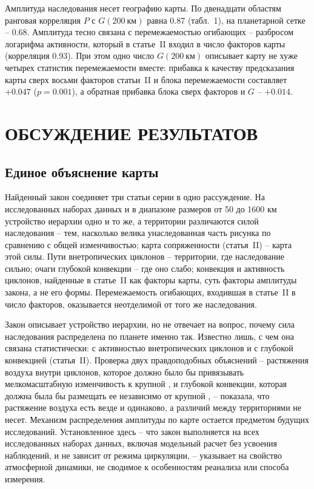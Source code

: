 \documentclass[12pt,a4paper]{article}
\begin{document}
Амплитуда наследования несет географию карты. По двенадцати областям ранговая корреляция $P$ с $G(200~\text{км})$ равна 0.87 (табл.~1), на планетарной сетке -- 0.68. Амплитуда тесно связана с перемежаемостью огибающих -- разбросом логарифма активности, который в статье~II входил в число факторов карты (корреляция 0.93). При этом одно число $G(200~\text{км})$ описывает карту не хуже четырех статистик перемежаемости вместе: прибавка к качеству предсказания карты сверх восьми факторов статьи~II и блока перемежаемости составляет $+0.047$ ($p = 0.001$), а обратная прибавка блока сверх факторов и $G$ -- $+0.014$.

\section{ОБСУЖДЕНИЕ РЕЗУЛЬТАТОВ}

\subsection{Единое объяснение карты}

Найденный закон соединяет три статьи серии в одно рассуждение. На исследованных наборах данных и в диапазоне размеров от 50 до 1600 км устройство иерархии одно и то же, а территории различаются силой наследования -- тем, насколько велика унаследованная часть рисунка по сравнению с общей изменчивостью; карта сопряженности (статья~II) -- карта этой силы. Пути внетропических циклонов -- территории, где наследование сильно; очаги глубокой конвекции -- где оно слабо; конвекция и активность циклонов, найденные в статье~II как факторы карты, суть факторы амплитуды закона, а не его формы. Перемежаемость огибающих, входившая в статье~II в число факторов, оказывается неотделимой от того же наследования.

Закон описывает устройство иерархии, но не отвечает на вопрос, почему сила наследования распределена по планете именно так. Известно лишь, с чем она связана статистически: с активностью внетропических циклонов и с глубокой конвекцией (статья~II). Проверка двух правдоподобных объяснений -- растяжения воздуха внутри циклонов, которое должно было бы привязывать мелкомасштабную изменчивость к крупной \cite{HoskinsBretherton1972}, и глубокой конвекции, которая должна была бы размещать ее независимо от крупной \cite{CraigCohen2006}, -- показала, что растяжение воздуха есть везде и одинаково, а различий между территориями не несет. Механизм распределения амплитуды по карте остается предметом будущих исследований. Установленное здесь -- что закон выполняется на всех исследованных наборах данных, включая модельный расчет без усвоения наблюдений, и не зависит от режима циркуляции, -- указывает на свойство атмосферной динамики, не сводимое к особенностям реанализа или способа измерения.
\end{document}

